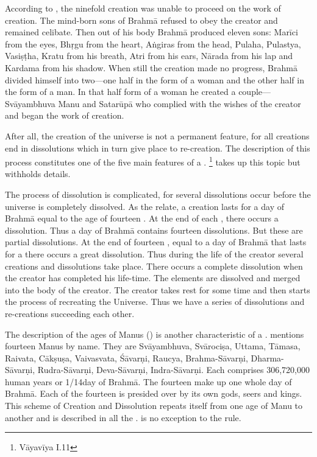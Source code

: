 According to , the ninefold creation was unable to proceed on
the work of creation. The mind-born sons of Brahmā refused to obey the creator
and remained celibate. Then out of his body Brahmā produced eleven sons: Marīci
from the eyes, Bhṛgu from the heart, Aṅgiras from the head, Pulaha, Pulastya,
Vasiṣṭha, Kratu from his breath, Atri from his ears, Nārada from his lap and
Kardama from his shadow. When still the creation made no progress, Brahmā divided
himself into two—one half in the form of a woman and the other half in the form
of a man. In that half form of a woman he created a couple—Svāyambhuva Manu
and Satarūpā who complied with the wishes of the creator and began the work of
creation.

After all, the creation of the universe is not a permanent feature, for all
creations end in dissolutions which in turn give place to re-creation.
The description of this process constitutes one of the five main features of
a . \footnote{Vāyavīya I.11} takes up this topic
but withholds details.

The process of dissolution is complicated, for several dissolutions occur before
the universe is completely dissolved. As the relate, a creation
lasts for a day of Brahmā equal to the age of fourteen . At the
end of each , there occurs a dissolution. Thus a day of Brahmā
contains fourteen dissolutions. But these are partial dissolutions. At the end of
fourteen , equal to a day of Brahmā that lasts for a 
there occurs a great dissolution. Thus during the life of the creator several
creations and dissolutions take place. There occurs a complete dissolution when
the creator has completed his life-time. The elements are dissolved and merged
into the body of the creator. The creator takes rest for some time and then
starts the process of recreating the Universe. Thus we have a series of
dissolutions and re-creations succeeding each other.

The description of the ages of Manus () is another
characteristic of a .  mentions fourteen Manus
by name. They are Svāyambhuva, Svārociṣa, Uttama, Tāmasa, Raivata, Cākṣuṣa,
Vaivasvata, Śāvarṇi, Raucya, Brahma-Sāvarṇi, Dharma-Sāvarṇi, Rudra-Sāvarṇi,
Deva-Sāvarṇi, Indra-Sāvarṇi. Each  comprises 306,720,000 human
years or 1/14\th day of Brahmā. The fourteen  make up one whole
day of Brahmā. Each of the fourteen  is presided over by its
own gods, seers and kings. This scheme of Creation and Dissolution repeats
itself from one age of Manu to another and is described in all the
.  is no exception to the rule.

